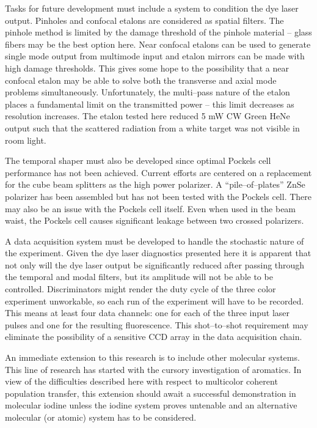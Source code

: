 Tasks for future development must include a system to condition the dye laser output. Pinholes and confocal etalons are considered as spatial filters. The pinhole method is limited by the damage threshold of the pinhole material -- glass fibers may be the best option here. Near confocal etalons can be used to generate single mode output from multimode input and etalon mirrors can be made with high damage thresholds. This gives some hope to the possibility that a near confocal etalon may be able to solve both the transverse and axial mode problems simultaneously. Unfortunately, the multi--pass nature of the etalon places a fundamental limit on the transmitted power -- this limit decreases as resolution increases. The etalon tested here reduced 5 mW CW Green HeNe output such that the scattered radiation from a white target was not visible in room light.

The temporal shaper must also be developed since optimal Pockels cell performance has not been achieved. Current efforts are centered on a replacement for the cube beam splitters as the high power polarizer. A ``pile--of--plates'' ZnSe polarizer has been assembled but has not been tested with the Pockels cell. There may also be an issue with the Pockels cell itself. Even when used in the beam waist, the Pockels cell causes significant leakage between two crossed polarizers.

A data acquisition system must be developed to handle the stochastic nature of the experiment. Given the dye laser diagnostics presented here it is apparent that not only will the dye laser output be significantly reduced after passing through the temporal and modal filters, but its amplitude will not be able to be controlled. Discriminators might render the duty cycle of the three color experiment unworkable, so each run of the experiment will have to be recorded. This means at least four data channels: one for each of the three input laser pulses and one for the resulting fluorescence. This shot--to--shot requirement may eliminate the possibility of a sensitive CCD array in the data acquisition chain.

An immediate extension to this research is to include other molecular systems. This line of research has started with the cursory investigation of aromatics. In view of the difficulties described here with respect to multicolor coherent population transfer, this extension should await a successful demonstration in molecular iodine unless the iodine system proves untenable and an alternative molecular (or atomic) system has to be considered.

